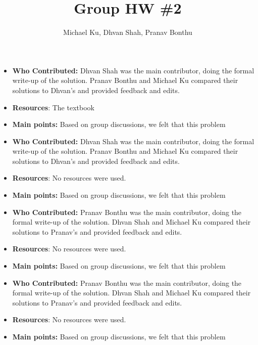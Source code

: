\documentclass[11pt]{article}
\begin{document}
\title{Group HW \#2}
\author{Michael Ku, Dhvan Shah, Pranav Bonthu}
\maketitle


\begin{itemize}
    \item \textbf{Who Contributed:} Dhvan Shah was the main contributor, doing the formal write-up of the solution. Pranav Bonthu and Michael Ku compared their solutions to Dhvan's and provided feedback and edits.
    \item \textbf{Resources}: The textbook
    \item \textbf{Main points:} Based on group discussions, we felt that this problem
\end{itemize}

\begin{itemize}
    \item \textbf{Who Contributed:} Dhvan Shah was the main contributor, doing the formal write-up of the solution. Pranav Bonthu and Michael Ku compared their solutions to Dhvan's and provided feedback and edits.
    \item \textbf{Resources}: No resources were used.
    \item \textbf{Main points:} Based on group discussions, we felt that this problem
\end{itemize}

\begin{itemize}
    \item \textbf{Who Contributed:} Pranav Bonthu was the main contributor, doing the formal write-up of the solution. Dhvan Shah and Michael Ku compared their solutions to Pranav's and provided feedback and edits.
    \item \textbf{Resources}: No resources were used.
    \item \textbf{Main points:} Based on group discussions, we felt that this problem
\end{itemize}

\begin{itemize}
    \item \textbf{Who Contributed:} Pranav Bonthu was the main contributor, doing the formal write-up of the solution. Dhvan Shah and Michael Ku compared their solutions to Pranav's and provided feedback and edits.
    \item \textbf{Resources}: No resources were used.
    \item \textbf{Main points:} Based on group discussions, we felt that this problem
\end{itemize}
\end{document}
